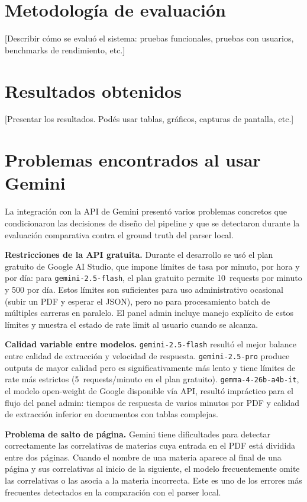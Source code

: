 \documentclass[12pt, a4paper]{report}
\begin{document}
\section{Metodología de evaluación}

[Describir cómo se evaluó el sistema: pruebas funcionales, pruebas con usuarios,
benchmarks de rendimiento, etc.]

\section{Resultados obtenidos}

[Presentar los resultados. Podés usar tablas, gráficos, capturas de pantalla, etc.]

\section{Problemas encontrados al usar Gemini}
\label{sec:problemas-gemini}

La integración con la API de Gemini presentó varios problemas concretos que condicionaron
las decisiones de diseño del pipeline y que se detectaron durante la evaluación comparativa
contra el ground truth del parser local.

\textbf{Restricciones de la API gratuita.} Durante el desarrollo se usó el plan gratuito
de Google AI Studio, que impone límites de tasa por minuto, por hora y por día: para
\texttt{gemini-2.5-flash}, el plan gratuito permite 10~requests por minuto y 500 por día.
Estos límites son suficientes para uso administrativo ocasional (subir un PDF y esperar el
JSON), pero no para procesamiento batch de múltiples carreras en paralelo. El panel admin
incluye manejo explícito de estos límites y muestra el estado de rate limit al usuario
cuando se alcanza.

\textbf{Calidad variable entre modelos.} \texttt{gemini-2.5-flash} resultó el mejor
balance entre calidad de extracción y velocidad de respuesta. \texttt{gemini-2.5-pro}
produce outputs de mayor calidad pero es significativamente más lento y tiene límites de
rate más estrictos (5~requests/minuto en el plan gratuito). \texttt{gemma-4-26b-a4b-it},
el modelo open-weight de Google disponible vía API, resultó impráctico para el flujo del
panel admin: tiempos de respuesta de varios minutos por PDF y calidad de extracción
inferior en documentos con tablas complejas.

\textbf{Problema de salto de página.} Gemini tiene dificultades para detectar correctamente
las correlativas de materias cuya entrada en el PDF está dividida entre dos páginas. Cuando
el nombre de una materia aparece al final de una página y sus correlativas al inicio de la
siguiente, el modelo frecuentemente omite las correlativas o las asocia a la materia
incorrecta. Este es uno de los errores más frecuentes detectados en la comparación con el
parser local.
\end{document}
